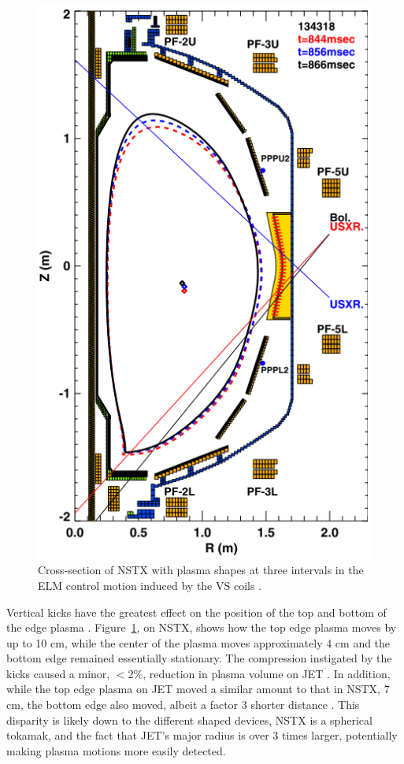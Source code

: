 \documentclass[12pt]{article}  %
\newcommand{\citep}[1]{\cite{#1}}
\begin{document}
\begin{figure}
\includegraphics[scale=0.5]{Figures/VKshape.png}
\centering
\caption{Cross-section of NSTX with plasma shapes at three intervals in the ELM control motion induced by the VS coils \cite{Gerhardt2010}.}\label{fig:VKshape}
\end{figure}

Vertical kicks have the greatest effect on the position of the top and bottom of the edge plasma \cite{Gerhardt2010}. Figure~\ref{fig:VKshape}, on NSTX, shows how the top edge plasma moves by up to 10 cm, while the center of the plasma moves approximately 4 cm and the bottom edge remained essentially stationary. The compression instigated by the kicks caused a minor, $< 2\%$, reduction in plasma volume on JET \cite{DelaLuna2016}. In addition, while the top edge plasma on JET moved a similar amount to that in NSTX, 7 cm, the bottom edge also moved, albeit a factor 3 shorter distance \citep{DelaLuna2016}. This disparity is likely down to the different shaped devices, NSTX is a spherical tokamak, and the fact that JET's major radius is over 3 times larger, potentially making plasma motions more easily detected.
\end{document}

